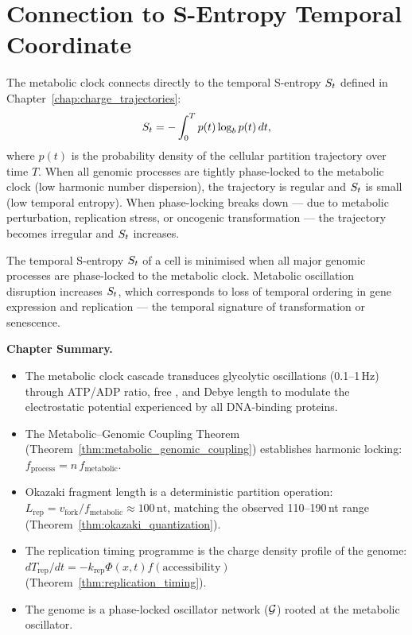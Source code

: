 \section{Connection to S-Entropy Temporal Coordinate}
\label{sec:clock_sentropy}

The metabolic clock connects directly to the temporal S-entropy $S_t$ defined
in Chapter~\ref{chap:charge_trajectories}:
\begin{equation}
  S_t = -\int_0^T p(t)\log_b p(t)\,dt,
\end{equation}
where $p(t)$ is the probability density of the cellular partition trajectory
over time $T$. When all genomic processes are tightly phase-locked to the
metabolic clock (low harmonic number dispersion), the trajectory is regular
and $S_t$ is small (low temporal entropy). When phase-locking breaks down ---
due to metabolic perturbation, replication stress, or oncogenic transformation
--- the trajectory becomes irregular and $S_t$ increases.

\begin{corollary}
\label{cor:metabolic_coherence}
The temporal S-entropy $S_t$ of a cell is minimised when all major genomic
processes are phase-locked to the metabolic clock. Metabolic oscillation
disruption increases $S_t$, which corresponds to loss of temporal ordering
in gene expression and replication --- the temporal signature of transformation
or senescence.
\end{corollary}

\begin{chapterbox}
\textbf{Chapter Summary.}
\begin{itemize}
  \item The metabolic clock cascade transduces glycolytic oscillations
        (0.1--1\,Hz) through ATP/ADP ratio, free , and Debye
        length to modulate the electrostatic potential experienced by all
        DNA-binding proteins.
  \item The Metabolic--Genomic Coupling Theorem
        (Theorem~\ref{thm:metabolic_genomic_coupling}) establishes harmonic
        locking: $f_{\mathrm{process}} = n\,f_{\mathrm{metabolic}}$.
  \item Okazaki fragment length is a deterministic partition operation:
        $L_{\mathrm{rep}} = v_{\mathrm{fork}}/f_{\mathrm{metabolic}}
        \approx 100\,\text{nt}$, matching the observed 110--190\,nt range
        (Theorem~\ref{thm:okazaki_quantization}).
  \item The replication timing programme is the charge density profile of
        the genome: $dT_{\mathrm{rep}}/dt = -k_{\mathrm{rep}}\Phi(x,t)f(\text{accessibility})$
        (Theorem~\ref{thm:replication_timing}).
  \item The genome is a phase-locked oscillator network
        ($\mathcal{G}$) rooted at the metabolic oscillator.
\end{itemize}
\end{chapterbox}
